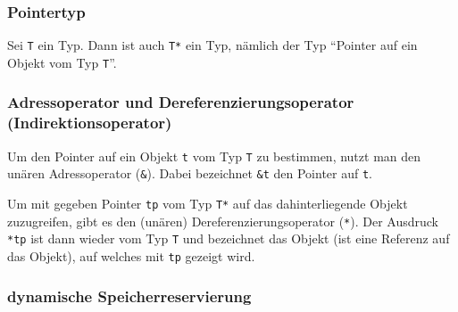 \documentclass[a4paper]{report}
\begin{document}
\subsubsection{Pointertyp}
Sei \texttt{T} ein Typ. Dann ist auch \texttt{T*} ein Typ, nämlich der Typ "`Pointer auf ein Objekt vom Typ \texttt{T}"'.

\subsubsection{Adressoperator und Dereferenzierungsoperator (Indirektionsoperator)}
Um den Pointer auf ein Objekt \texttt{t} vom Typ \texttt{T} zu bestimmen, nutzt man den unären Adressoperator (\texttt{\&}). Dabei bezeichnet \texttt{\&t} den Pointer auf \texttt{t}.

Um mit gegeben Pointer \texttt{tp} vom Typ \texttt{T*} auf das dahinterliegende Objekt zuzugreifen, gibt es den (unären) Dereferenzierungsoperator (\texttt{*}). Der Ausdruck \texttt{*tp} ist dann wieder vom Typ \texttt{T} und bezeichnet das Objekt (ist eine Referenz auf das Objekt), auf welches mit \texttt{tp} gezeigt wird.

\subsubsection{dynamische Speicherreservierung}
\end{document}
